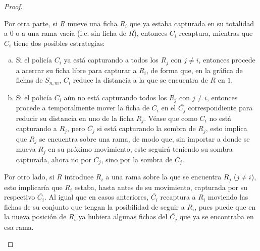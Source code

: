 \begin{proof}
\begin{enumerate}
            Por otra parte, si $R$ mueve una ficha $R_i$ que ya estaba capturada
            en su totalidad a $0$ o a una rama vac\'ia (i.e. sin ficha de $R$),
            entonces $\overline{C_i}$ recaptura, mientras que $C_i$ tiene dos
            posibles estrategias:
            \begin{enumerate}[(a)]
                \item Si el polic\'ia $C_i$ ya est\'a capturando a todos los
                $R_j$ con $j\neq i$, entonces procede a acercar su ficha libre
                para capturar a $R_i$, de forma que, en la gr\'afica de fichas
                de $S_{n,m}$, $C_i$ reduce la distancia a la que se encuentra de
                $R$ en $1$.
                \item Si el polic\'ia $C_i$ a\'un no est\'a capturando todos los
                $R_j$ con $j\neq i$, entonces procede a temporalmente mover la
                ficha de $C_i$ en el $\overline{C_j}$ correspondiente para
                reducir su distancia en uno de la ficha $R_j$. V\'ease que como
                $C_i$ no est\'a capturando a $R_j$, pero $\overline{C_j}$ si
                est\'a capturando la sombra de $R_j$, esto implica que $R_j$ se
                encuentra sobre una rama, de modo que, sin importar a donde se
                mueva $R_j$ en su pr\'oximo movimiento, este seguir\'a teniendo
                su sombra capturada, ahora no por $\overline{C_j}$, sino por la
                sombra de $\overline{C_j}$.
            \end{enumerate}
            
            Por otro lado, si $R$ introduce $R_i$ a una rama sobre la que se
            encuentra $R_j$ ($j\neq i$), esto implicar\'ia que $R_i$ estaba,
            hasta antes de su movimiento, capturada por su respectivo
            $\overline{C_i}$. Al igual que en casos anteriores, $\overline{C_i}$
            recaptura a $R_i$ moviendo las fichas de su conjunto que tengan la
            posibilidad de seguir a $R_i$, pues puede que en la nueva posici\'on
            de $R_i$ ya hubiera algunas fichas del $\overline{C_j}$ que ya se
            encontraba en esa rama. 
            

\end{enumerate}
\end{proof}
